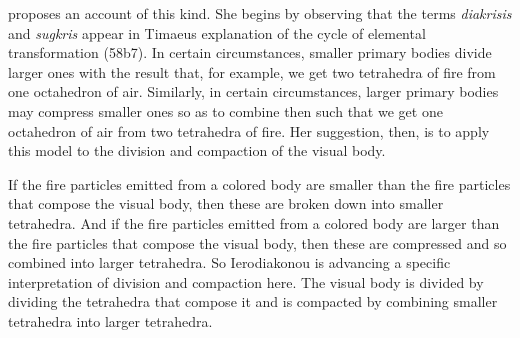 \citet{Ierodiakonou:2005ly} proposes an account of this kind. She begins by observing that the terms \emph{diakrisis} and \emph{sugkris} appear in Timaeus explanation of the cycle of elemental transformation (58b7). In certain circumstances, smaller primary bodies divide larger ones with the result that, for example, we get two tetrahedra of fire from one octahedron of air. Similarly, in certain circumstances, larger primary bodies may compress smaller ones so as to combine then such that we get one octahedron of air from two tetrahedra of fire. Her suggestion, then, is to apply this model to the division and compaction of the visual body.

If the fire particles emitted from a colored body are smaller than the fire particles that compose the visual body, then these are broken down into smaller tetrahedra. And if the fire particles emitted from a colored body are larger than the fire particles that compose the visual body, then these are compressed and so combined into larger tetrahedra. So Ierodiakonou is advancing a specific interpretation of division and compaction here. The visual body is divided by dividing the tetrahedra that compose it and is compacted by combining smaller tetrahedra into larger tetrahedra.

